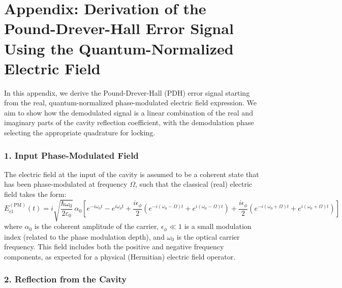 
\chapter*{Appendix: Derivation of the Pound-Drever-Hall Error Signal Using the Quantum-Normalized Electric Field}

In this appendix, we derive the Pound-Drever-Hall (PDH) error signal starting from the real, quantum-normalized phase-modulated electric field expression. We aim to show how the demodulated signal is a linear combination of the real and imaginary parts of the cavity reflection coefficient, with the demodulation phase selecting the appropriate quadrature for locking.

\subsection*{1. Input Phase-Modulated Field}

The electric field at the input of the cavity is assumed to be a coherent state that has been phase-modulated at frequency \( \Omega \), such that the classical (real) electric field takes the form:
\begin{equation}
    E_{\text{cl}}^{(\text{PM})}(t) = i \sqrt{\frac{\hbar \omega_0}{2 \varepsilon_0}} \, \alpha_0 \left[
        e^{-i\omega_0 t} - e^{i\omega_0 t}
        + \frac{i \epsilon_\phi}{2} \left( e^{-i(\omega_0 - \Omega)t} + e^{i(\omega_0 - \Omega)t} \right)
        + \frac{i \epsilon_\phi}{2} \left( e^{-i(\omega_0 + \Omega)t} + e^{i(\omega_0 + \Omega)t} \right)
    \right]
    \label{eq:pm_field}
\end{equation}
where \( \alpha_0 \) is the coherent amplitude of the carrier, \( \epsilon_\phi \ll 1 \) is a small modulation index (related to the phase modulation depth), and \( \omega_0 \) is the optical carrier frequency. This field includes both the positive and negative frequency components, as expected for a physical (Hermitian) electric field operator.

\subsection*{2. Reflection from the Cavity}

